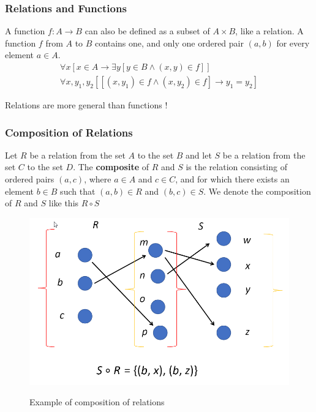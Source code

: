 \documentclass{article}
\begin{document}
\subsubsection{Relations and Functions} A function $ f: A \rightarrow B $ can also be defined as a subset of $ A \times B $, like a relation. A function $ f $ from $ A $ to $ B $ contains one, and only one ordered pair $ (a,b) $ for every element $ a \in A $.
\begin{align}
\forall x[x \in A \rightarrow \exists y[y \in B \wedge (x,y) \in f]]\\
\forall x,y_1,y_2[[(x,y_1) \in f \wedge (x,y_2) \in f] \rightarrow y_1 = y_2]
\end{align}

\begin{tcolorbox}[width=12.1cm, leftrule=3mm]
Relations are more general than functions !
\end{tcolorbox}

\subsubsection{Composition of Relations} Let $ R $ be a relation from the set $ A $ to the set $ B $ and let $ S $ be a relation from the set $ C $ to the set $ D $. The \textbf{composite} of $ R $ and $ S $ is the relation consisting of ordered pairs $ (a,c) $, where $ a \in A $ and $ c \in C $, and for which there exists an element $ b \in B $ such that $ (a,b) \in R $ and $ (b,c) \in S $. We denote the composition of $ R $ and $ S $ like this $ R \circ S $

\begin{figure}[h]
  \includegraphics[width=\linewidth]{relation.png}
  \label{fig:relation}
	
\caption{Example of composition of relations}	
\end{figure}
\end{document}

